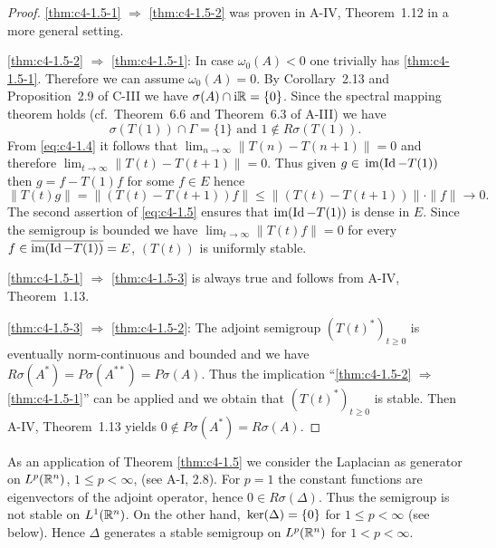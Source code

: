 \begin{proof}
\ref{thm:c4-1.5-1} $\Rightarrow$ \ref{thm:c4-1.5-2} was proven in A-IV, Theorem~1.12 in a more general setting.

\ref{thm:c4-1.5-2} $\Rightarrow$ \ref{thm:c4-1.5-1}:  In case $\omega_{0}(A) < 0$ one trivially has \ref{thm:c4-1.5-1}.
Therefore we can assume $\omega_{0}(A) = 0$.
By Corollary~2.13 and Proposition~2.9 of C-III we have $\sigma(A) \cap \mathrm{i}\mathbb{R} = \{0\}$.
Since the spectral mapping theorem holds (cf.\ Theorem~6.6 and Theorem~6.3 of A-III) we have
\begin{equation}\label{eq:c4-1.5}
\sigma(T(1)) \cap \Gamma = \{1\} \text{ and } 1 \notin R{\sigma}(T(1)).
\end{equation}
From \ref{eq:c4-1.4} it follows that $\lim_{n \to \infty} \|T(n) - T(n+1)\| = 0$ and therefore $\lim_{t \to \infty} \|T(t) - T(t+1)\| = 0$.
Thus given $g \in \mathop{}\mathrm{im}(\operatorname{Id} - T(1))$ then $g = f - T(1)f$ for some $f \in E$ hence 
\[
\|T(t)g\| = \|(T(t) - T(t+1))f\| \leq \|(T(t) - T(t+1))\| \cdot \|f\| \to 0.
\]
The second assertion of \ref{eq:c4-1.5} ensures that $\text{im}(\operatorname{Id} - T(1))$ is dense in $E$.
Since the semigroup is bounded we have $\lim_{t \to \infty} \|T(t)f\| = 0$ for every $f \in \overline{\text{im}(\operatorname{Id} - T(1))} = E$, \ie  $(T(t))$ is uniformly stable.

\ref{thm:c4-1.5-1} $\Rightarrow$ \ref{thm:c4-1.5-3} is always true and follows from A-IV, Theorem~1.13.

\ref{thm:c4-1.5-3} $\Rightarrow$ \ref{thm:c4-1.5-2}:  
The adjoint semigroup $(T(t)^*)_{t \geq 0}$ is eventually norm-continuous and boun\-ded and we have $R{\sigma}(A^*) = P{\sigma}(A^{**}) = P{\sigma}(A)$.
Thus the implication \enquote{\ref{thm:c4-1.5-2} $\Rightarrow$ \ref{thm:c4-1.5-1}} can be applied and we obtain that $(T(t)^*)_{t \geq 0}$ is stable.
Then A-IV, Theorem~1.13 yields $0 \notin P{\sigma}(A^*) = R{\sigma}(A)$.
\end{proof}
As an application of Theorem \ref{thm:c4-1.5}  we consider the Laplacian as generator on $L^{p}(\mathbb{R}^{n})$, $1 \leq p < \infty$, (see A-I, 2.8).
For $p = 1$ the constant functions are eigenvectors of the adjoint operator, hence $0 \in R{\sigma}(\Delta)$.
Thus the semigroup is not stable on $L^{1}(\mathbb{R}^{n})$.
On the other hand, $\mathop{}\mathrm{ker}(\Delta) =\{ 0 \}$ for $ 1 \leq p < \infty$ (see below). 
Hence $\Delta$ generates a stable semigroup on $L^{p}(\mathbb{R}^{n})$ for $1 < p < \infty$.


